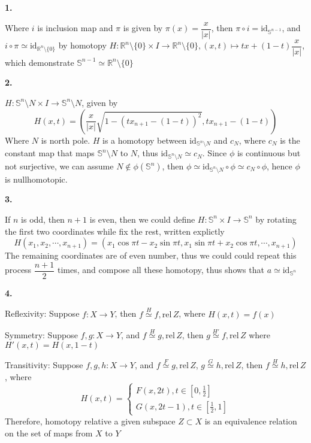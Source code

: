 \documentclass{article}
\begin{document}
\textbf{1.} \par
\begin{center}
\end{center}
Where $i$ is inclusion map and $\pi$ is given by $\pi(x)=\dfrac{x}{|x|}$, then $\pi\circ i=\mathrm{id}_{\mathbb{S}^{n-1} }$, and $i\circ\pi\simeq\mathrm{id}_{\mathbb{R}^{n}\setminus\{0\} }$ by homotopy $H:\mathbb{R}^{n}\setminus\{0\}\times I \rightarrow \mathbb{R}^{n}\setminus\{0\}, (x,t)\mapsto tx+(1-t)\dfrac{x}{|x|}$, which demonstrate $\mathbb{S}^{n-1} \simeq\mathbb{R}^{n}\setminus\{0\} $ \par
\textbf{2.} \par
$H:\mathbb{S}^{n}\setminus N\times I\rightarrow\mathbb{S}^{n}\setminus N$, given by \[ H(x,t)=\left( \dfrac{x}{|x|}\sqrt{1-\left(tx_{n+1}-(1-t)\right)^{2}}, tx_{n+1}-(1-t) \right) \] Where $N$ is north pole.
$H$ is a homotopy between $\mathrm{id}_{\mathbb{S}^{n}\setminus N}$ and $c_{N}$, where $c_{N}$ is the constant map that maps $\mathbb{S}^{n}\setminus N$ to $N$, thus $\mathrm{id}_{\mathbb{S}^{n}\setminus N}\simeq c_{N}$. Since $\phi$ is continuous but not surjective, we can assume $N\notin \phi(\mathbb{S}^{n})$, then $\phi\simeq\mathrm{id}_{\mathbb{S}^{n}\setminus N}\circ\phi\simeq c_{N}\circ\phi$, hence $\phi$ is nullhomotopic. \par
\textbf{3.} \par
If $n$ is odd, then $n+1$ is even, then we could define $H:\mathbb{S}^{n}\times I\rightarrow \mathbb{S}^{n}$ by rotating the first two coordinates while fix the rest, written explictly \[H(x_{1},x_{2},\cdots,x_{n+1})=\left(x_{1}\cos{\pi t}-x_{2}\sin{\pi t}, x_{1}\sin{\pi t}+x_{2}\cos{\pi t}, \cdots, x_{n+1}\right)\] The remaining coordinates are of even number, thus we could could repeat this process $\dfrac{n+1}{2}$ times, and compose all these homotopy, thus shows that $a\simeq\mathrm{id}_{\mathbb{S}^{n}}$ \par
\textbf{4.} \par
Reflexivity: Suppose $f:X\rightarrow Y$, then \(f\overset{H}{\simeq}f,\mathrm{rel}\,Z\), where $H(x,t)=f(x)$ \par
Symmetry: Suppose $f,g:X\rightarrow Y$, and \(f\overset{H}{\simeq}g,\mathrm{rel}\,Z\), then \(g\overset{H'}{\simeq}f,\mathrm{rel}\,Z\) where $H'(x,t)=H(x,1-t)$ \par
Transitivity: Suppose $f,g,h:X\rightarrow Y$, and \(f\overset{F}{\simeq}g,\mathrm{rel}\,Z\),  \(g\overset{G}{\simeq}h,\mathrm{rel}\,Z\), then  \(f\overset{H}{\simeq}h,\mathrm{rel}\,Z\), where\[
H(x,t)=
\left\{\begin{matrix}
F\left(x,2t\right), t\in\left[0,\frac{1}{2}\right]\\ 
G\left(x,2t-1\right), t\in\left[\frac{1}{2},1\right]
\end{matrix}\right.
\]
Therefore, homotopy relative a given subspace $Z\subset X$ is an equivalence relation on the set of maps from $X$ to $Y$
\end{document}
